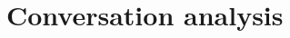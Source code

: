 \documentclass[output=book
  ,colorlinks
  ,showindex
  ,draftmode
  ,openreview
  ,nobabel
  ,booklanguage=italian
  ,oldstylenumbers
  ,multiauthors
  ,biblatex
  ]{langscibook}
\begin{document}
%
%
%
%
%
%
%
%
% 
%
% 
%
% 
\section{Conversation analysis}

%
%
% 
%
%
%
%
% 
% 
\end{document}
